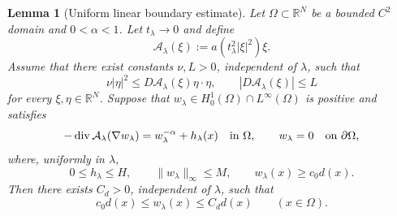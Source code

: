\documentclass[11pt,leqno]{amsart}
\newtheorem{lemma}[theorem]{Lemma}
\begin{document}
\begin{lemma}[Uniform linear boundary estimate]
\label{lem:uniform-linear-boundary}
Let $\Omega\subset\mathbb R^N$ be a bounded $C^2$ domain and
$0<\alpha<1$.  Let $t_\lambda\to0$ and define
\[
 \mathcal A_\lambda(\xi):=a(t_\lambda^2|\xi|^2)\xi .
\]
Assume that there exist constants $\nu,L>0$, independent of
$\lambda$, such that
\begin{equation}\label{eq:A-uniform-ellipticity}
 \nu|\eta|^2
 \le D\mathcal A_\lambda(\xi)\eta\cdot\eta,
 \qquad
 |D\mathcal A_\lambda(\xi)|\le L
\end{equation}
for every $\xi,\eta\in\mathbb R^N$.  Suppose that
$w_\lambda\in H_0^1(\Omega)\cap L^\infty(\Omega)$ is positive and
satisfies
\begin{equation}\label{eq:abstract-scaled}
 -\operatorname{div}\mathcal A_\lambda(\nabla w_\lambda)
 =
 w_\lambda^{-\alpha}+h_\lambda(x)
 \quad\hbox{in }\Omega,
 \qquad
 w_\lambda=0\quad\hbox{on }\partial\Omega,
\end{equation}
where, uniformly in $\lambda$,
\begin{equation}\label{eq:uniform-preboundary}
 0\le h_\lambda\le H,\qquad
 \|w_\lambda\|_\infty\le M,\qquad
 w_\lambda(x)\ge c_0d(x).
\end{equation}
Then there exists $C_d>0$, independent of $\lambda$, such that
\begin{equation}\label{eq:two-sided-distance}
 c_0d(x)\le w_\lambda(x)\le C_dd(x)
 \qquad (x\in\Omega).
\end{equation}
\end{lemma}
\end{document}
